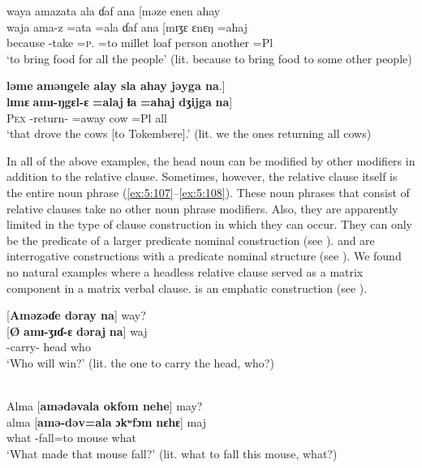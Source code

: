 \medskip
waya  amazata  ala  ɗaf  ana  [məze  enen  ahay  \\
\gll waja ama-z =ata =ala ɗaf ana [mɪʒɛ ɛnɛŋ =ahaj\\
      because  {\DEP}-take =\textsc{p}.{\IO}  =to  {millet loaf}  {\DAT} person  another  =Pl\\
\glt ‘to bring food for all the people’ (lit. because to bring food to some other people)
     
\medskip
\textbf{ləme} \textbf{aməngele  alay  sla  ahay  jəyga  na}.]\\
 \gll \textbf{lɪmɛ} \textbf{amɪ{}-ŋgɛl-ɛ} \textbf{=alaj} \textbf{ɬa} \textbf{=ahaj} \textbf{dʒijga} \textbf{na}]\\
      \textsc{Pex}  {\DEP}-return-{\CL}  =away  cow  =Pl  all  {\PSP}\\
\glt  ‘that drove the cows [to Tokembere].’ (lit. we the ones returning all cows) 
\z

In all of the above examples, the head noun can be modified by other modifiers in addition to the relative clause. Sometimes, however, the relative clause itself is the entire noun phrase (\ref{ex:5:107}--\ref{ex:5:108}). These noun phrases that consist of relative clauses take no other noun phrase modifiers. Also, they are apparently limited in the type of clause construction in which they can occur. They can only be the predicate of a larger predicate nominal construction (see ).  and  are interrogative constructions with a predicate nominal structure (see ). We found no natural examples where a headless relative clause served as a matrix component in a matrix verbal clause.  is an emphatic construction (see ). 

\ea \label{ex:5:107}
{}[\textbf{Aməzəɗe  dəray  na}]  way?\\
\gll  {}[\textbf{Ø}    \textbf{amɪ-ʒɪɗ{}-ɛ}    \textbf{dəraj}  \textbf{na}]  waj\\
      { } {\DEP}-carry-{\CL}    head  {\PSP}  who\\
\glt  ‘Who will win?’ (lit. the one to carry the head, who?) 
\z


\ea \label{ex:5:108}\\\relax
 {}Alma  [\textbf{amədəvala  okfom  nehe}]  may?\\
\gll  {}alma [\textbf{amə-dəv=ala} \textbf{ɔkʷfɔm} \textbf{nɛhɛ}]  maj\\
      {what } {\DEP}-fall=to     mouse    {\DEM}    what\\
\glt  ‘What made that mouse fall?’ (lit. what to fall this mouse, what?)
\z

